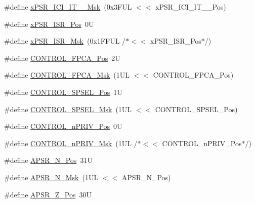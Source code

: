 \begin{DoxyCompactItemize}
\#define \mbox{\hyperlink{group___c_m_s_i_s___c_o_r_e_gae98918458d70d79b32ce200b55ffe744}{x\+P\+S\+R\+\_\+\+I\+C\+I\+\_\+\+I\+T\+\_\+\_\+\+Msk}}~(0x3\+F\+U\+L $<$$<$ x\+P\+S\+R\+\_\+\+I\+C\+I\+\_\+\+I\+T\+\_\+\_\+\+Pos)
\item 
\#define \mbox{\hyperlink{group___c_m_s_i_s___c_o_r_e_ga21bff245fb1aef9683f693d9d7bb2233}{x\+P\+S\+R\+\_\+\+I\+S\+R\+\_\+\+Pos}}~0U
\item 
\#define \mbox{\hyperlink{group___c_m_s_i_s___c_o_r_e_gadf8eed87e0081dfe1ef1c78a0ea91afd}{x\+P\+S\+R\+\_\+\+I\+S\+R\+\_\+\+Msk}}~(0x1\+F\+F\+U\+L /$\ast$$<$$<$ x\+P\+S\+R\+\_\+\+I\+S\+R\+\_\+\+Pos$\ast$/)
\item 
\#define \mbox{\hyperlink{group___c_m_s_i_s___c_o_r_e_gac7018b59b07134c5363b33eb94918a58}{C\+O\+N\+T\+R\+O\+L\+\_\+\+F\+P\+C\+A\+\_\+\+Pos}}~2U
\item 
\#define \mbox{\hyperlink{group___c_m_s_i_s___c_o_r_e_gad20bb0212b2e1864f24af38d93587c79}{C\+O\+N\+T\+R\+O\+L\+\_\+\+F\+P\+C\+A\+\_\+\+Msk}}~(1\+U\+L $<$$<$ C\+O\+N\+T\+R\+O\+L\+\_\+\+F\+P\+C\+A\+\_\+\+Pos)
\item 
\#define \mbox{\hyperlink{group___c_m_s_i_s___c_o_r_e_ga07eafc53e609895342c6a530e9d01310}{C\+O\+N\+T\+R\+O\+L\+\_\+\+S\+P\+S\+E\+L\+\_\+\+Pos}}~1U
\item 
\#define \mbox{\hyperlink{group___c_m_s_i_s___c_o_r_e_ga70b29840969b06909da21369b0b05b53}{C\+O\+N\+T\+R\+O\+L\+\_\+\+S\+P\+S\+E\+L\+\_\+\+Msk}}~(1\+U\+L $<$$<$ C\+O\+N\+T\+R\+O\+L\+\_\+\+S\+P\+S\+E\+L\+\_\+\+Pos)
\item 
\#define \mbox{\hyperlink{group___c_m_s_i_s___c_o_r_e_ga51b95bc03ec0d815b459bde0b14a5908}{C\+O\+N\+T\+R\+O\+L\+\_\+n\+P\+R\+I\+V\+\_\+\+Pos}}~0U
\item 
\#define \mbox{\hyperlink{group___c_m_s_i_s___c_o_r_e_gaef3b20d77acb213338f89ce5e7bc36b0}{C\+O\+N\+T\+R\+O\+L\+\_\+n\+P\+R\+I\+V\+\_\+\+Msk}}~(1\+U\+L /$\ast$$<$$<$ C\+O\+N\+T\+R\+O\+L\+\_\+n\+P\+R\+I\+V\+\_\+\+Pos$\ast$/)
\item 
\#define \mbox{\hyperlink{group___c_m_s_i_s___c_o_r_e_gac469528d210043c7bd3f12f0e6824766}{A\+P\+S\+R\+\_\+\+N\+\_\+\+Pos}}~31U
\item 
\#define \mbox{\hyperlink{group___c_m_s_i_s___c_o_r_e_gadbc2cf55a026f661b53fadfcf822cef1}{A\+P\+S\+R\+\_\+\+N\+\_\+\+Msk}}~(1\+U\+L $<$$<$ A\+P\+S\+R\+\_\+\+N\+\_\+\+Pos)
\item 
\#define \mbox{\hyperlink{group___c_m_s_i_s___c_o_r_e_ga3661286d108b1aca308d7445685eae3a}{A\+P\+S\+R\+\_\+\+Z\+\_\+\+Pos}}~30U
\item 

\end{DoxyCompactItemize}
